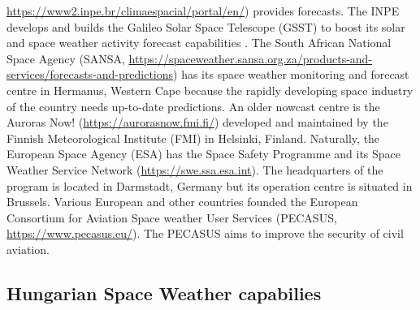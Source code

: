 \documentclass[sn-aps]{sn-jnl}%
\begin{document}
\url{https://www2.inpe.br/climaespacial/portal/en/}) provides forecasts. The INPE develops and builds the Galileo Solar Space Telescope (GSST) to boost its solar and space weather activity forecast capabilities \cite{pesquisas18:_galil_solar_space_teles_mission_study_repor}. The South African National Space Agency (SANSA, \url{https://spaceweather.sansa.org.za/products-and-services/forecasts-and-predictions}) has its space weather monitoring and forecast centre in Hermanus, Western Cape because the rapidly developing space industry of the country needs up-to-date predictions. An older nowcast centre is the Auroras Now! (\url{https://aurorasnow.fmi.fi/}) developed and maintained by the Finnish Meteorological Institute (FMI) in Helsinki, Finland. Naturally, the European Space Agency (ESA) has the Space Safety Programme and its Space Weather Service Network (\url{https://swe.ssa.esa.int}). The headquarters of the program is located in Darmstadt, Germany but its operation centre is situated in Brussels. Various European and other countries founded the European Consortium for Aviation Space weather User Services (PECASUS, \url{https://www.pecasus.eu/}). The PECASUS aims to improve the security of civil aviation.  


\subsection{Hungarian Space Weather capabilies}
\label{sec:hunswcap}
\end{document}
